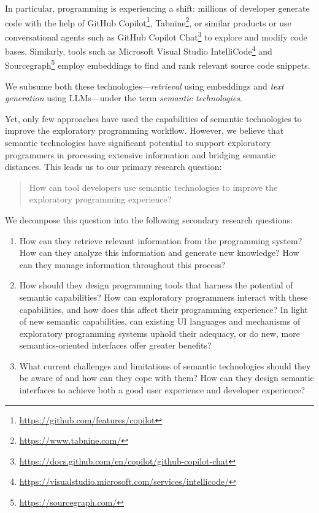 In particular, programming is experiencing a shift: millions of developer generate code with the help of GitHub Copilot\footnote{\url{https://github.com/features/copilot}}, Tabnine\footnote{\url{https://www.tabnine.com/}}, or similar products or use conversational agents such as GitHub Copilot Chat\footnote{\url{https://docs.github.com/en/copilot/github-copilot-chat}} to explore and modify code bases.
Similarly, tools such as Microsoft Visual Studio IntelliCode\footnote{\url{https://visualstudio.microsoft.com/services/intellicode/}} and Sourcegraph\footnote{\url{https://sourcegraph.com/}} employ embeddings to find and rank relevant source code snippets.

We subsume both these technologies---\emph{retrieval} using embeddings and \emph{text generation} using LLMs---under the term \emph{semantic technologies}.

\ParSep

Yet, only few approaches have used the capabilities of semantic technologies to improve the exploratory programming workflow.
However, we believe that semantic technologies have significant potential to support exploratory programmers in processing extensive information and bridging semantic distances.
This leads us to our primary research question:

\begin{quote}
	How can tool developers use semantic technologies to improve the exploratory programming experience?
\end{quote}

We decompose this question into the following secondary research questions:

\begin{enumerate}[label=RQ\arabic*]
	\item {}
		How can they retrieve relevant information from the programming system? How can they analyze this information and generate new knowledge?
		How can they manage information throughout this process?
	\item {}
		How should they design programming tools that harness the potential of semantic capabilities?
		How can exploratory programmers interact with these capabilities, and how does this affect their programming experience?
		In light of new semantic capabilities, can existing UI languages and mechanisms of exploratory programming systems uphold their adequacy, or do new, more semantics-oriented interfaces offer greater benefits?
	\item {}
		What current challenges and limitations of semantic technologies should they be aware of and how can they cope with them?
		How can they design semantic interfaces to achieve both a good user experience and developer experience?
\end{enumerate}


